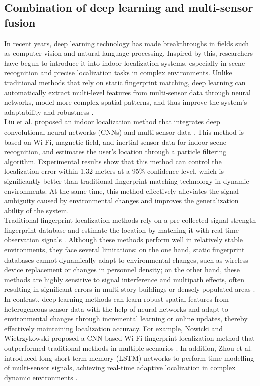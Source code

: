 \documentclass[12pt,a4paper]{article}
\numberwithin{equation}{section}
\begin{document}
\subsection{Combination of deep learning and multi-sensor fusion}
In recent years, deep learning technology has made breakthroughs in fields such as computer vision and natural language processing. Inspired by this, researchers have begun to introduce it into indoor localization systems, especially in scene recognition and precise localization tasks in complex environments. Unlike traditional methods that rely on static fingerprint matching, deep learning can automatically extract multi-level features from multi-sensor data through neural networks, model more complex spatial patterns, and thus improve the system's adaptability and robustness \cite{s151229867, nowicki2017ml}.\\
Liu et al. proposed an indoor localization method that integrates deep convolutional neural networks (CNNs)  and multi-sensor data \cite{s151229867}. This method is based on Wi-Fi, magnetic field, and inertial sensor data for indoor scene recognition, and estimates the user's location through a particle filtering algorithm. Experimental results show that this method can control the localization error within 1.32 meters at a 95\% confidence level, which is significantly better than traditional fingerprint matching technology in dynamic environments. At the same time, this method effectively alleviates the signal ambiguity caused by environmental changes and improves the generalization ability of the system.\\
Traditional fingerprint localization methods rely on a pre-collected signal strength fingerprint database and estimate the location by matching it with real-time observation signals \cite{ijgi6050135}. Although these methods perform well in relatively stable environments, they face several limitations: on the one hand, static fingerprint databases cannot dynamically adapt to environmental changes, such as wireless device replacement or changes in personnel density; on the other hand, these methods are highly sensitive to signal interference and multipath effects, often resulting in significant errors in multi-story buildings or densely populated areas \cite{zou2022magloc}.\\
In contrast, deep learning methods can learn robust spatial features from heterogeneous sensor data with the help of neural networks and adapt to environmental changes through incremental learning or online updates, thereby effectively maintaining localization accuracy. For example, Nowicki and Wietrzykowski proposed a CNN-based Wi-Fi fingerprint localization method that outperformed traditional methods in multiple scenarios \cite{nowicki2017ml}. In addition, Zhou et al. introduced long short-term memory (LSTM) networks to perform time modelling of multi-sensor signals, achieving real-time adaptive localization in complex dynamic environments \cite{zhou2022deep}.
\end{document}
